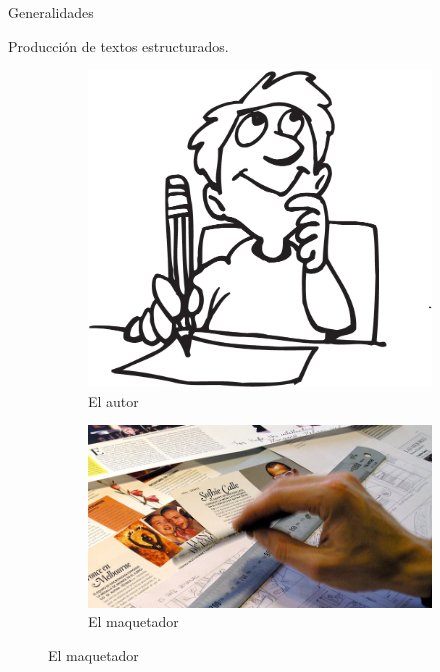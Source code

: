 \begin{frame}{Generalidades}
    \begin{block}{Producci\'on de textos estructurados.}
        \vspace{-.4cm}
        \begin{multicols}{2}
            \begin{figure}
                \centering
                \begin{subfigure}[b]{0.5\textwidth} 
                    \centering
                    \includegraphics[scale=.04]{images/autor}
                    \caption{El autor}			
                \end{subfigure}

                \vspace*{.25cm}			

                \begin{subfigure}[b]{0.5\textwidth} 
                    \centering
                    \includegraphics[scale=.08]{images/maquetador}
                    \caption{El maquetador}
                \end{subfigure}


\end{figure}
\end{multicols}
\end{block}
\end{frame}
